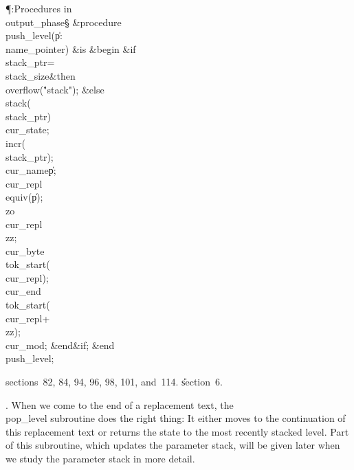 \Y\P\?\4:Procedures in \\{output\_phase}\X\S\?\6
\&{procedure}\8\1\\{push\_level}\?(\1\?\|p\?:\?\\{name\_pointer}\?\2)\?\2\8%
\&{is}\8\1\6
\4\&{begin}\6
\&{if}\1\1\8\\{stack\_ptr}\?=\?\\{stack\_size}\2\8\&{then}\6
\\{overflow}\?\1(\?\.{"stack"}\?\2)\?;\6
\4\&{else}\6
\\{stack}\?\1(\?\\{stack\_ptr}\?\2)\K\?\\{cur\_state};\6
\\{incr}\?\1(\?\\{stack\_ptr}\?\2)\?;\5
\\{cur\_name}\?\K\?\|p;\5
\\{cur\_repl}\?\K\?\\{equiv}\?\1(\?\|p\?\2)\?;\5
\\{zo}\?\K\?\\{cur\_repl}\?\?\\{zz};\5
\\{cur\_byte}\?\K\?\\{tok\_start}\?\1(\?\\{cur\_repl}\?\2)\?;\5
\\{cur\_end}\?\K\?\\{tok\_start}\?\1(\?\\{cur\_repl}\?+\?\\{zz}\?\2)\?;\5
\\{cur\_mod}\?\K{};\2\6
\&{end}\8\2\&{if}\1;\2\6
\&{end}\8\\{push\_level};\par
\A sections~82, 84, 94, 96, 98, 101, and~114.
\U section~6\*.\fi

. When we come to the end of a replacement text, the \\{pop\_level}
subroutine
does the right thing: It either moves to the continuation of this replacement
text or returns the state to the most recently stacked level. Part of this
subroutine, which updates the parameter stack, will be given later when we
study the parameter stack in more detail.

